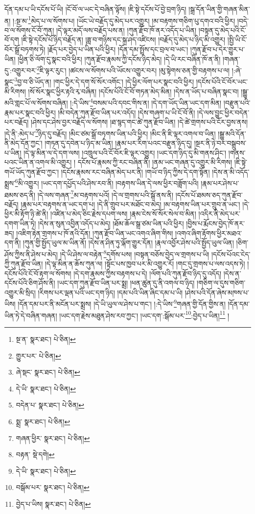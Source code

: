 དོན་དམ་པ་ཡི་དངོས་པོ་ཡི། །ངོ་བོ་ལ་ཡང་དེ་བཞིན་ལྟོས། །ཇི་སྟེ་དངོས་པོ་བྱེ་བྲག་ཉིད། །སྒྲ་དོན་ཡིན་གྱི་གཞན་མིན་ན། །:སྔ་མ་\footnote{སྔ་ན་  སྣར་ཐང་།  པེ་ཅིན། }མེད་པ་ལ་སོགས་པ། །ཡོང་ཡེ་བརྗོད་དུ་མེད་པར་འགྱུར། །མ་བརྟགས་གཅིག་པུ་དགའ་བའི་ཕྱིར། །བདེ་བ་ལ་སོགས་ངོ་བོ་ཀུན། །དེ་ལྟར་མདོ་ལས་བརྗོད་པས་ན། །ཀུན་རྫོབ་ཁོ་ནར་འདོད་པ་ཡིན། །བསྟན་དུ་མེད་པའི་ངོ་བོ་དག །ཇི་སྟེ་དངོས་པོ་ཉིད་བརྗོད་ན། །ཟླ་བ་གཉིས་དང་སྐྲ་ཤད་འཛིངས། །བརྗོད་དུ་མེད་པ་ཉིད་མི་འགྱུར། །སྤྱི་ཡི་ངོ་བོར་སྒྲོ་བཏགས་ཏེ། །རྗོད་པར་བྱེད་པ་ཡིན་པའི་ཕྱིར། །དོན་དམ་སྤྲོས་དང་བྲལ་བ་ཡང་། །ཀུན་རྫོབ་པ་དེར་གྱུར་པ་ཡིན། །ཕྱིན་ཅི་ལོག་དུ་སྣང་བའི་ཕྱིར། །ཀུན་རྫོབ་རྣམས་ཀྱི་དངོས་ཉིད་མེད། །དེ་ཡི་རང་བཞིན་ཁོ་ན་ནི། །གཞན་དུ་:འགྱུར་བར་\footnote{གྱུར་པར་  པེ་ཅིན། }ཇི་ལྟར་རུང་། །ཚངས་ལ་སོགས་པའི་ཡོངས་འགྱུར་བར། །མུ་སྟེགས་ཅན་གྱི་བརྟགས་པ་ལ། །:ཞེ་སྣང་\footnote{ཞེ་སྡང་  སྣར་ཐང་།  པེ་ཅིན། }བྱ་བ་ཅི་ཡོད་ན། །གང་ཕྱིར་དེ་དག་སོ་སོར་འགོང་། །དེ་ཕྱིར་ལོག་པར་སྣང་བའི་ཕྱིར། །དངོས་པོའི་ངོ་བོར་ཡང་མི་རིགས། །སོ་སོར་སྣང་ཕྱིར་རྟའི་རྭ་བཞིན། །དངོས་པོའི་ངོ་བོ་གཏན་མེད་མིན། །དེས་ན་ཡོད་པ་བཞིན་སྣང་བ། །སྒྱུ་མའི་གླང་པོ་ལ་སོགས་བཞིན། །:དེ་ཡིས་\footnote{དེ་ཡི་  སྣར་ཐང་།  པེ་ཅིན། }བསམ་པའི་དབང་གིས་ན། །དེ་དག་ཡོད་ཡིན་ཡང་དག་མིན། །བརྫུན་པའི་རྣམ་པར་སྣང་བའི་ཕྱིར། །མི་བདེན་ཀུན་རྫོབ་ཡིན་པར་འདོད། །དེས་གཞག་པ་ཡི་ངོ་བོ་ནི། །དེ་ལས་བྱུང་ཕྱིར་བདེན་པར་བརྗོད། །ཤེས་དང་ཤེས་བྱར་བརྗོད་ལ་སོགས། །ཐ་སྙད་གང་ཚེ་ཀུན་རྫོབ་ཡིན། །དེ་ཚེ་གྲགས་པའི་ངོར་བྱས་ནས། །དེ་ནི་:མེད་པ་\footnote{བདེན་པ་  སྣར་ཐང་།  པེ་ཅིན། }ཉིད་དུ་བརྗོད། །མིང་ཙམ་སྒྲོ་བཏགས་ཡིན་པའི་ཕྱིར། །མིང་ནི་ཇི་ལྟར་འགལ་བ་ཡིན། །སྒྱུ་མའི་དོན་ནི་མེད་དོན་ཀྱང་། །གཏན་དུ་དབེན་པ་ཉིད་མ་ཡིན། །རྣམ་པར་རིག་པའང་བརྫུན་ཉིད་དུ། །སྔར་ནི་ཉེ་བར་བསྒྲུབས་པ་ཡིན། །དེ་ལྟ་མིན་ལ་དེ་དག་ལས། །འཁྲུལ་པའི་ངོ་བོར་ཇི་ལྟར་འགྱུར། །ཡང་དག་ཉིད་དུ་མི་གནས་ཤིང་། །གནས་པའང་ཡིན་ན་འགལ་མི་འགྱུར། །
དངོས་པོ་རྣམས་ཀྱི་རང་བཞིན་ནི། །ནམ་ཡང་གཞན་དུ་འགྱུར་མི་རིགས། །ཇི་སྟེ་གཡོ་ཡོད་ཀུན་རྫོབ་ཀྱང་། །དངོས་རྣམས་རང་བཞིན་མེད་པར་ནི། །གཡོ་བ་ཉིད་ཀྱིས་དེ་དག་སྟོན། །དེས་ན་མི་འདོད་སྨྲས་\footnote{སྨྲ་  སྣར་ཐང་།  པེ་ཅིན། }མི་འགྱུར། །ཡང་དག་དཔྱོད་པའི་ཤེས་རབ་ནི། །བརྟགས་ཡིན་དེ་ལས་ཕྱིར་བཟློག་པའི། །རྣམ་པར་ཤེས་པ་ཐམས་ཅད་ནི། །དེ་ལས་གཞན་\footnote{གཞན་ཕྱིར་  སྣར་ཐང་།  པེ་ཅིན། }མ་བརྟགས་པའོ། །དེ་ལ་གྲགས་པའི་སྒོ་ནས་ནི། །དངོས་པོ་ཐམས་ཅད་ཀུན་རྫོབ་བརྗོད། །རྣམ་པར་བརྟགས་ན་ཡང་དག་པ། །དེ་ནི་གྲུབ་པར་མཐོང་བ་མེད། །མ་བརྟགས་ཡིན་པར་གྲུབ་ན་ཡང་། །དེ་ཕྱིར་མི་རྟོག་ཉི་ཚེ་ནི། །འཛིན་པ་མེད་ཅིང་རྗེས་དཔག་ལས། །རྣམ་ངེས་སོ་སོར་སེལ་བ་མིན། །འདིར་ནི་མེད་པར་དགག་ཡིན་ཏེ། །དེས་ན་སུན་འབྱིན་འདོད་པ་མེད། །ཐོམ་ཆོལ་སྒྲ་ཙམ་ཡིན་པའི་ཕྱིར། །བྱིས་པ་རྨོངས་བྱེད་ཁོ་ནར་ཟད། །འཇིག་རྟེན་གྲགས་པ་ཁོ་ནའི་དོན། །ཀུན་རྫོབ་ཡིན་ཡང་འགའ་ཞིག་གིས། །འགའ་ཞིག་རྟོགས་ཕྱིར་མཐའ་དག་ནི། །ཀུན་གྱི་སྤྱོད་ཡུལ་མ་ཡིན་ནོ། །དེས་ན་ཤིན་ཏུ་ལྐོག་གྱུར་དོན། །རྣལ་འབྱོར་ཤེས་པའི་སྤྱོད་ཡུལ་ཡིན། །ཅིག་ཤོས་ཀྱིས་ནི་ཤེས་པ་མེད། །དེ་ཡི་ཤེས་ལ་བརྟེན་\footnote{བརྟན་  སྡེ་དགེ། }དགོས་པས། །བསྟན་བཅོས་བྱེད་ལ་གྲགས་པ་ཡི། །དངོས་པོའང་ངེད་ཀྱི་ཀུན་རྫོབ་ཡིན། །དེ་ལྟ་མིན་ན་ཆོས་ཀུན་ལ། །སྟོང་པས་ཁྱབ་པར་མི་འགྱུར་རོ། །གང་དུ་གྲགས་པ་ལས་འདས་ཏེ། །དངོས་པོའི་ངོ་བོ་རྟག་ལ་སོགས། །དེ་དག་རྣམས་ཀྱིས་བརྟགས་པ་དེ། །ལོག་པའི་ཀུན་རྫོབ་ཉིད་དུ་འདོད། །དེས་ན་དངོས་པོའི་ཅིག་ཤོས་ནི། །ཡང་དག་ཀུན་རྫོབ་ཡིན་པར་སྨྲ། །ཕན་ཚུན་དུ་ནི་འགལ་བ་ཉིད། །གཅིག་ལ་དུས་གཅིག་འགྱུར་མི་སྲིད། །རིགས་པར་ལྡན་པའི་ཡང་དག་ཉིད། །དམ་པའི་ཡིན་ཞིང་དམ་པ་ཡི། །ཤེས་པའི་དོན་ཞེས་མཁས་པ་ཡིས། །དོན་དམ་པར་ནི་མངོན་པར་སྨྲས། །དེ་ཡི་ཡུལ་ལ་ཤེས་པ་གང་། །:དེ་ཡིས་\footnote{དེ་ཡི་  སྣར་ཐང་།  པེ་ཅིན། }གཞན་གྱི་དོན་གྱིས་ན། །དོན་དམ་ཡིན་ཏེ་དེ་བཞིན་གཞན། །ཡང་དག་རྗེས་མཐུན་ཤེས་རབ་ཀྱང་། །ཡང་དག་:སྒོམ་པར་\footnote{བསྒོམ་པར་  སྣར་ཐང་།  པེ་ཅིན། }:བྱེད་པ་ཡིན།\footnote{བྱེད་པ་ཡིས།  སྣར་ཐང་།  པེ་ཅིན། } །
